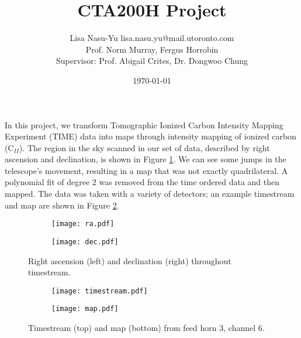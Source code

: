 \documentclass[12pt]{article}
\title{CTA200H Project}
\author{Lisa Nasu-Yu \small{lisa.nasu.yu@mail.utoronto.com}\\
Prof. Norm Murray, Fergus Horrobin\\
Supervisor: Prof. Abigail Crites, Dr. Dongwoo Chung}
\date{\today}
\begin{document}
\maketitle
In this project, we transform Tomographic Ionized Carbon Intensity Mapping Experiment (TIME) data into maps through intensity mapping of ionized carbon (C$_{II}$). The region in the sky scanned in our set of data, described by right ascension and declination, is shown in Figure \ref{fig:coord}. We can see some jumps in the telescope's movement, resulting in a map that was not exactly quadrilateral. A polynomial fit of degree 2 was removed from the time ordered data and then mapped. The data was taken with a variety of detectors; an example timestream and map are shown in Figure \ref{fig:map}.

\begin{figure}[H]
	\centering
	\begin{subfigure}{0.5\linewidth}
		\centering
		\texttt{[image: ra.pdf]}
		\subcaption{}
	\end{subfigure}%
	\begin{subfigure}{0.5\linewidth}
			\centering
			\texttt{[image: dec.pdf]}
			\subcaption{}
	\end{subfigure}
	\caption{Right ascension (left) and declination (right) throughout timestream.}
	\label{fig:coord}
\end{figure}

\begin{figure}[H]
	\centering
	\begin{subfigure}{0.5\linewidth}
		\centering
		\texttt{[image: timestream.pdf]}
		\subcaption{}
	\end{subfigure}
	\begin{subfigure}{1.3\linewidth}
			\centering
			\texttt{[image: map.pdf]}
			\subcaption{}
	\end{subfigure}
	\caption{Timestream (top) and map (bottom) from feed horn 3, channel 6.}
	\label{fig:map}
\end{figure}
\end{document}
